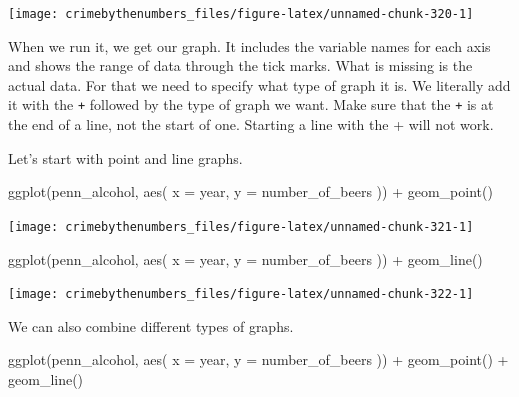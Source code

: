 \documentclass[
]{krantz}
\makeatletter
\newenvironment{Shaded}{\begin{snugshade}}{\end{snugshade}}
\newcommand{\AttributeTok}[1]{\textcolor[rgb]{0.61,0.61,0.61}{#1}}
\newcommand{\FunctionTok}[1]{\textcolor[rgb]{0,0,0}{#1}}
\newcommand{\NormalTok}[1]{#1}
\newcommand{\SpecialCharTok}[1]{\textcolor[rgb]{0,0,0}{#1}}
\newenvironment{kframe}{%
\medskip{}
\setlength{\fboxsep}{.8em}
 \def\at@end@of@kframe{}%
 \ifinner\ifhmode%
  \def\at@end@of@kframe{\end{minipage}}%
  \begin{minipage}{\columnwidth}%
 \fi\fi%
 \def\FrameCommand##1{\hskip\@totalleftmargin \hskip-\fboxsep
 \colorbox{shadecolor}{##1}\hskip-\fboxsep
     \hskip-\linewidth \hskip-\@totalleftmargin \hskip\columnwidth}%
 \MakeFramed {\advance\hsize-\width
   \@totalleftmargin\z@ \linewidth\hsize
   \@setminipage}}%
 {\par\unskip\endMakeFramed%
 \at@end@of@kframe}
\renewenvironment{Shaded}{\begin{kframe}}{\end{kframe}}
\makeatother
\begin{document}
\begin{center}\texttt{[image: crimebythenumbers\_files/figure-latex/unnamed-chunk-320-1]} \end{center}

When we run it, we get our graph. It includes the variable
names for each axis and shows the range of data through the
tick marks. What is missing is the actual data. For that we
need to specify what type of graph it is. We literally add
it with the \texttt{+} followed by the type of graph we
want. Make sure that the \texttt{+} is at the end of a line,
not the start of one. Starting a line with the + will not
work.

Let's start with point and line graphs.

\begin{Shaded}
\begin{Highlighting}[]
\FunctionTok{ggplot}\NormalTok{(penn\_alcohol, }\FunctionTok{aes}\NormalTok{(}
  \AttributeTok{x =}\NormalTok{ year,}
  \AttributeTok{y =}\NormalTok{ number\_of\_beers}
\NormalTok{)) }\SpecialCharTok{+}
  \FunctionTok{geom\_point}\NormalTok{()}
\end{Highlighting}
\end{Shaded}

\begin{center}\texttt{[image: crimebythenumbers\_files/figure-latex/unnamed-chunk-321-1]} \end{center}

\begin{Shaded}
\begin{Highlighting}[]
\FunctionTok{ggplot}\NormalTok{(penn\_alcohol, }\FunctionTok{aes}\NormalTok{(}
  \AttributeTok{x =}\NormalTok{ year,}
  \AttributeTok{y =}\NormalTok{ number\_of\_beers}
\NormalTok{)) }\SpecialCharTok{+}
  \FunctionTok{geom\_line}\NormalTok{()}
\end{Highlighting}
\end{Shaded}

\begin{center}\texttt{[image: crimebythenumbers\_files/figure-latex/unnamed-chunk-322-1]} \end{center}

We can also combine different types of graphs.

\begin{Shaded}
\begin{Highlighting}[]
\FunctionTok{ggplot}\NormalTok{(penn\_alcohol, }\FunctionTok{aes}\NormalTok{(}
  \AttributeTok{x =}\NormalTok{ year,}
  \AttributeTok{y =}\NormalTok{ number\_of\_beers}
\NormalTok{)) }\SpecialCharTok{+}
  \FunctionTok{geom\_point}\NormalTok{() }\SpecialCharTok{+}
  \FunctionTok{geom\_line}\NormalTok{()}
\end{Highlighting}
\end{Shaded}
\end{document}

